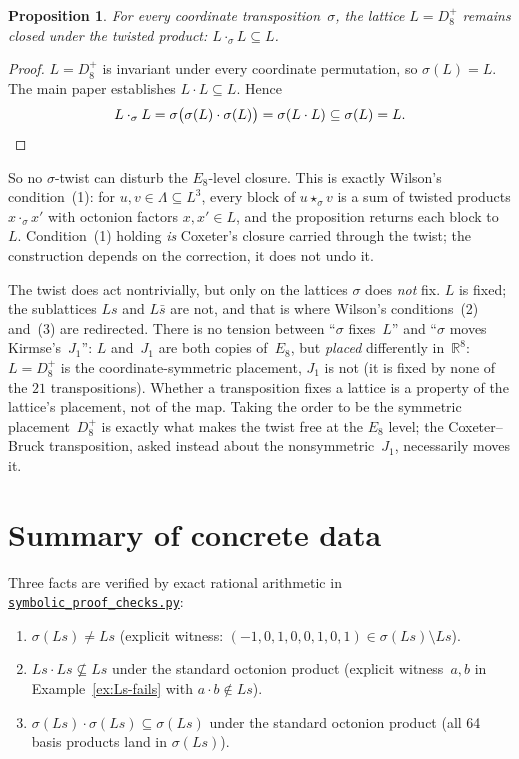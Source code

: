 \documentclass[11pt]{amsart}
\newcommand{\LL}{\Lambda}
\newcommand{\RR}{\mathbb{R}}
\newtheorem*{proposition}{Proposition}
\begin{document}
\begin{proposition}
For every coordinate transposition~$\sigma$, the lattice $L = D_8^+$
remains closed under the twisted product:
$L \cdot_\sigma L \subseteq L$.
\end{proposition}

\begin{proof}
$L = D_8^+$ is invariant under every coordinate permutation, so
$\sigma(L) = L$.  The main paper establishes $L \cdot L \subseteq L$.
Hence
\[
  L \cdot_\sigma L
  = \sigma\bigl(\sigma(L) \cdot \sigma(L)\bigr)
  = \sigma(L \cdot L)
  \subseteq \sigma(L) = L. \qedhere
\]
\end{proof}

So no $\sigma$-twist can disturb the $E_8$-level closure.  This is
exactly Wilson's condition~(1): for $u, v \in \LL \subseteq L^3$, every
block of $u \star_\sigma v$ is a sum of twisted products
$x \cdot_\sigma x'$ with octonion factors $x, x' \in L$, and the
proposition returns each block to~$L$.  Condition~(1) holding
\emph{is} Coxeter's closure carried through the twist; the
construction depends on the correction, it does not undo it.

The twist does act nontrivially, but only on the lattices
$\sigma$ does \emph{not} fix.  $L$ is fixed; the sublattices $Ls$ and
$L\bar s$ are not, and that is where Wilson's conditions~(2) and~(3)
are redirected.  There is no tension between ``$\sigma$ fixes~$L$'' and
``$\sigma$ moves Kirmse's~$J_1$'': $L$ and~$J_1$ are both copies
of~$E_8$, but \emph{placed} differently in~$\RR^8$: $L = D_8^+$ is
the coordinate-symmetric placement, $J_1$ is not (it is fixed by none
of the $21$ transpositions).  Whether a transposition fixes a lattice
is a property of the lattice's placement, not of the map.  Taking the
order to be the symmetric placement~$D_8^+$ is exactly what makes the
twist free at the $E_8$ level; the Coxeter--Bruck transposition, asked instead
about the nonsymmetric~$J_1$, necessarily moves it.

\section{Summary of concrete data}

\noindent Three facts are verified by exact rational
arithmetic in
\href{../python_project/src/symbolic_proof_checks.py}
     {\texttt{symbolic\_proof\_checks.py}}:
\begin{enumerate}
\item $\sigma(Ls) \ne Ls$ (explicit witness:
  $(-1, 0, 1, 0, 0, 1, 0, 1) \in \sigma(Ls) \setminus Ls$).
\item $Ls \cdot Ls \not\subseteq Ls$ under the standard octonion
  product (explicit witness~$a, b$ in
  Example~\ref{ex:Ls-fails} with $a \cdot b \notin Ls$).
\item $\sigma(Ls) \cdot \sigma(Ls) \subseteq \sigma(Ls)$ under the
  standard octonion product (all 64 basis products land in
  $\sigma(Ls)$).
\end{enumerate}
\end{document}
